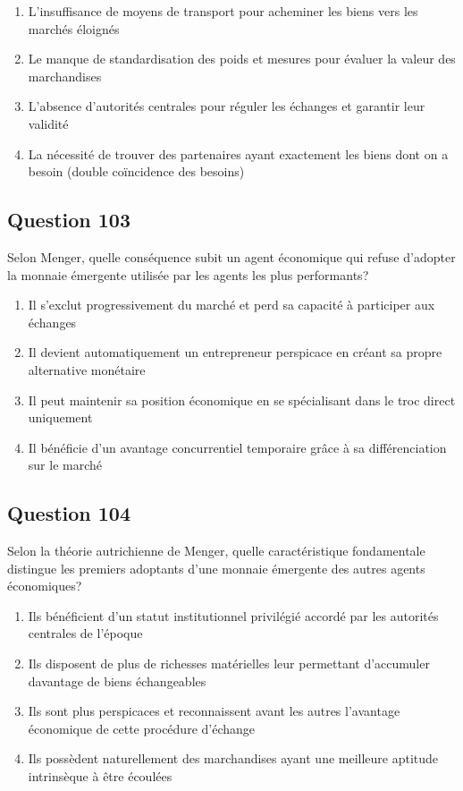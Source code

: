 \documentclass[12pt,a4paper]{article}
\begin{document}
\begin{enumerate}[label=\Alph*., leftmargin=*]
\item L'insuffisance de moyens de transport pour acheminer les biens vers les marchés éloignés
\item Le manque de standardisation des poids et mesures pour évaluer la valeur des marchandises
\item L'absence d'autorités centrales pour réguler les échanges et garantir leur validité
\item La nécessité de trouver des partenaires ayant exactement les biens dont on a besoin (double coïncidence des besoins)
\end{enumerate}

\bigskip


\subsection*{Question 103}
Selon Menger, quelle conséquence subit un agent économique qui refuse d'adopter la monnaie émergente utilisée par les agents les plus performants?

\begin{enumerate}[label=\Alph*., leftmargin=*]
\item Il s'exclut progressivement du marché et perd sa capacité à participer aux échanges
\item Il devient automatiquement un entrepreneur perspicace en créant sa propre alternative monétaire
\item Il peut maintenir sa position économique en se spécialisant dans le troc direct uniquement
\item Il bénéficie d'un avantage concurrentiel temporaire grâce à sa différenciation sur le marché
\end{enumerate}

\bigskip


\subsection*{Question 104}
Selon la théorie autrichienne de Menger, quelle caractéristique fondamentale distingue les premiers adoptants d'une monnaie émergente des autres agents économiques?

\begin{enumerate}[label=\Alph*., leftmargin=*]
\item Ils bénéficient d'un statut institutionnel privilégié accordé par les autorités centrales de l'époque
\item Ils disposent de plus de richesses matérielles leur permettant d'accumuler davantage de biens échangeables
\item Ils sont plus perspicaces et reconnaissent avant les autres l'avantage économique de cette procédure d'échange
\item Ils possèdent naturellement des marchandises ayant une meilleure aptitude intrinsèque à être écoulées
\end{enumerate}
\end{document}
